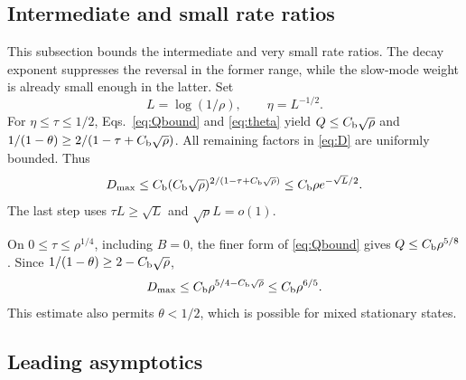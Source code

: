 \documentclass[aps,pra,reprint,amsmath,amssymb,nofootinbib,floatfix,longbibliography]{revtex4-2}
\theoremstyle{aps}
\begin{document}
\subsection{Intermediate and small rate ratios}

This subsection bounds the intermediate and very small rate ratios. The decay exponent suppresses the reversal in the former range, while the slow-mode weight is already small enough in the latter. Set
\begin{equation}\label{eq:Leta}
 L=\log(1/\rho),\qquad\eta=L^{-1/2}.
\end{equation}
For $\eta\le\tau\le1/2$, Eqs.~\eqref{eq:Qbound} and \eqref{eq:theta} yield
$Q\le C_{\rm b}\sqrt\rho$ and
$1/(1-\theta)\ge2/(1-\tau+C_{\rm b}\sqrt\rho)$.
All remaining factors in \eqref{eq:D} are uniformly bounded. Thus
\begin{equation}\label{eq:intermediate}
 D_{\max}\le C_{\rm b}(C_{\rm b}\sqrt\rho)^{2/(1-\tau+C_{\rm b}\sqrt\rho)}
 \le C_{\rm b}\rho e^{-\sqrt L/2}.
\end{equation}
The last step uses $\tau L\ge\sqrt L$ and $\sqrt\rho L=o(1)$.

On $0\le\tau\le\rho^{1/4}$, including $B=0$, the finer form of \eqref{eq:Qbound} gives $Q\le C_{\rm b}\rho^{5/8}$. Since $1/(1-\theta)\ge2-C_{\rm b}\sqrt\rho$,
\begin{equation}\label{eq:tiny}
 D_{\max}\le C_{\rm b}\rho^{5/4-C_{\rm b}\sqrt\rho}\le C_{\rm b}\rho^{6/5}.
\end{equation}
This estimate also permits $\theta<1/2$, which is possible for mixed stationary states.

\subsection{Leading asymptotics}
\end{document}
